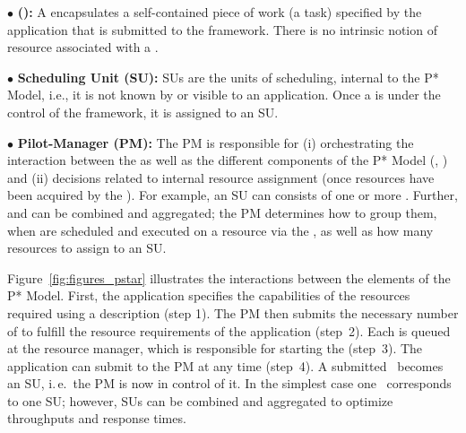 \documentclass{sig-alternate}
\begin{document}
\noindent$\bullet$ \textbf{\computeunit  (\cu):} A \cu  encapsulates a 
  self-contained piece of work (a task) specified by the application that is
  submitted to the \pilotjob framework. There is no intrinsic notion
  of resource associated with a \cu.

\noindent$\bullet$ \textbf{Scheduling Unit (SU):} SUs are the units of 
  scheduling, internal to the P* Model, i.e., it is not known by or
  visible to an application. Once a \cu is
  under the control of the \pilotjob framework, it is assigned
  to an SU.

\noindent$\bullet$ \textbf{Pilot-Manager (PM):} The PM is responsible for (i)
  orchestrating the interaction between the \pilots as well as the
  different components of the P* Model (\cus, \sus) and (ii) decisions
  related to internal resource assignment (once resources have been
  acquired by the \pilotjob).  For example, an SU can consists of one
  or more \cus. Further, \cus and \sus can be combined and aggregated;
  the PM determines how to group them, when \sus are scheduled and
  executed on a resource via the \pilot, as well as how many resources
  to assign to an SU.


Figure~\ref{fig:figures_pstar} illustrates the interactions between the
elements of the P* Model. First, the application specifies the capabilities of
the resources required using a \pilotjob description (step 1). The PM then
submits the necessary number of \pilots to fulfill the resource requirements
of the application (step~2). Each \pilot is queued at the resource manager,
which is responsible for starting the \pilot (step~3). The application can
submit \cus to the PM at any time (step~4). A submitted \cu \ becomes an SU,
i.\,e.\ the PM is now in control of it. In the simplest case one \cu \
corresponds to one SU; however, SUs can be combined and aggregated to optimize
throughputs and response times. 
\end{document}

